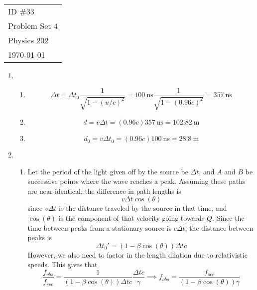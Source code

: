 \documentclass[fleqn]{article}[12pt]
\begin{document}
    \begin{tabular}{l}
        ID \#33 \\
        Problem Set 4 \\
        Physics 202 \\
        \today
    \end{tabular}

\begin{enumerate}
    \item \begin{enumerate}
        \item
        \begin{equation*}
            \Delta t = \Delta t_0 \frac{1}{\sqrt{1-(u/c)^2}} = \SI{100}{\nano\s}\frac{1}{\sqrt{1-(0.96c)^2}} = \SI{357}{\nano\s}
        \end{equation*}
        \item
        \begin{equation*}
            d = v \Delta t = (0.96c)\SI{357}{\nano\second} = \SI{102.82}{\m}
        \end{equation*}
        \item
        \begin{equation*}
            d_0 = v \Delta t_0 = (0.96c)\SI{100}{\nano\second} = \SI{28.8}{\m}
        \end{equation*}
    \end{enumerate}

    \item \begin{enumerate}
        \item Let the period of the light given off by the source be $\Delta t$, and $A$ and $B$ be successive points where the wave reaches a peak. Assuming these paths are near-identical, the difference in path lengths is
        \begin{equation*}
            v \Delta t \cos(\theta)
        \end{equation*}
        since $v \Delta t$ is the distance traveled by the source in that time, and $\cos(\theta)$ is the component of that velocity going towards $Q$. Since the time between peaks from a stationary source is $c\Delta t$, the distance between peaks is
        \begin{equation*}
            \Delta t_0' = (1-\beta\cos(\theta))\Delta t c
        \end{equation*}
        However, we also need to factor in the length dilation due to relativistic speeds. This gives that
        \begin{equation*}
            \frac{f_{obs}}{f_{sce}} = \frac{1}{(1-\beta\cos(\theta))\Delta t c} \frac{\Delta t c}{\gamma} \implies f_{obs} = \frac{f_{sce}}{(1-\beta \cos(\theta))\gamma}
        \end{equation*}


\end{enumerate}
\end{enumerate}
\end{document}
